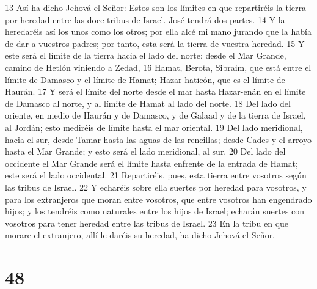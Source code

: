 13 Así ha dicho Jehová el Señor: Estos son los límites en que repartiréis la tierra por heredad entre las doce tribus de Israel. José tendrá dos partes.
14 Y la heredaréis así los unos como los otros; por ella alcé mi mano jurando que la había de dar a vuestros padres; por tanto, esta será la tierra de vuestra heredad.
15 Y este será el límite de la tierra hacia el lado del norte; desde el Mar Grande, camino de Hetlón viniendo a Zedad,
16 Hamat, Berota, Sibraim, que está entre el límite de Damasco y el límite de Hamat; Hazar-haticón, que es el límite de Haurán.
17 Y será el límite del norte desde el mar hasta Hazar-enán en el límite de Damasco al norte, y al límite de Hamat al lado del norte.
18 Del lado del oriente, en medio de Haurán y de Damasco, y de Galaad y de la tierra de Israel, al Jordán; esto mediréis de límite hasta el mar oriental.
19 Del lado meridional, hacia el sur, desde Tamar hasta las aguas de las rencillas; desde Cades y el arroyo hasta el Mar Grande; y esto será el lado meridional, al sur.
20 Del lado del occidente el Mar Grande será el límite hasta enfrente de la entrada de Hamat; este será el lado occidental.
21 Repartiréis, pues, esta tierra entre vosotros según las tribus de Israel.
22 Y echaréis sobre ella suertes por heredad para vosotros, y para los extranjeros que moran entre vosotros, que entre vosotros han engendrado hijos; y los tendréis como naturales entre los hijos de Israel; echarán suertes con vosotros para tener heredad entre las tribus de Israel.
23 En la tribu en que morare el extranjero, allí le daréis su heredad, ha dicho Jehová el Señor.

\chapter{48}

